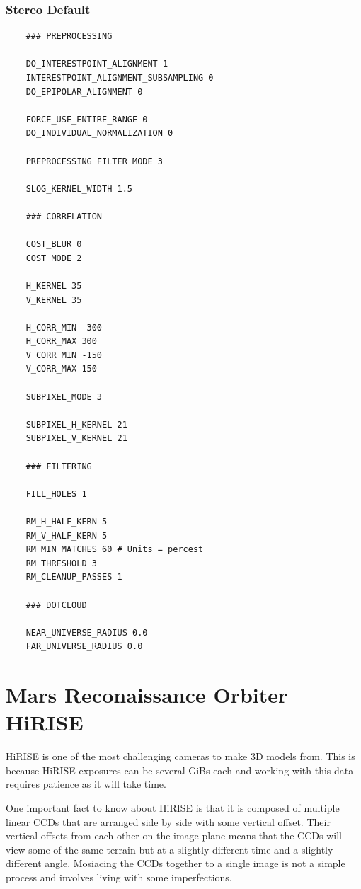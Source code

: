 \subsubsection*{Stereo Default}

\begin{verbatim}
    ### PREPROCESSING

    DO_INTERESTPOINT_ALIGNMENT 1
    INTERESTPOINT_ALIGNMENT_SUBSAMPLING 0
    DO_EPIPOLAR_ALIGNMENT 0

    FORCE_USE_ENTIRE_RANGE 0
    DO_INDIVIDUAL_NORMALIZATION 0

    PREPROCESSING_FILTER_MODE 3

    SLOG_KERNEL_WIDTH 1.5

    ### CORRELATION

    COST_BLUR 0
    COST_MODE 2

    H_KERNEL 35
    V_KERNEL 35

    H_CORR_MIN -300
    H_CORR_MAX 300
    V_CORR_MIN -150
    V_CORR_MAX 150

    SUBPIXEL_MODE 3

    SUBPIXEL_H_KERNEL 21
    SUBPIXEL_V_KERNEL 21

    ### FILTERING

    FILL_HOLES 1

    RM_H_HALF_KERN 5
    RM_V_HALF_KERN 5
    RM_MIN_MATCHES 60 # Units = percest
    RM_THRESHOLD 3
    RM_CLEANUP_PASSES 1

    ### DOTCLOUD

    NEAR_UNIVERSE_RADIUS 0.0
    FAR_UNIVERSE_RADIUS 0.0
\end{verbatim}

\section{Mars Reconaissance Orbiter HiRISE}

HiRISE is one of the most challenging cameras to make 3D models
from. This is because HiRISE exposures can be several GiBs each and
working with this data requires patience as it will take time.

One important fact to know about HiRISE is that it is composed of
multiple linear CCDs that are arranged side by side with some vertical
offset. Their vertical offsets from each other on the image plane
means that the CCDs will view some of the same terrain but at a
slightly different time and a slightly different angle. Mosiacing the
CCDs together to a single image is not a simple process and involves
living with some imperfections.

